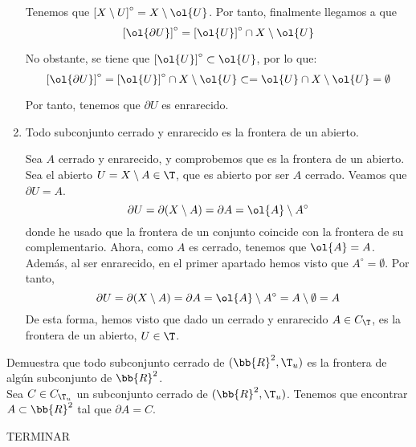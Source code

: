 \begin{ejercicio}
\begin{enumerate}
        Tenemos que $\left[X\setminus U\right]^\circ=X\setminus \ol{U}$. Por tanto, finalmente llegamos a que 
        $$\left[\ol{\partial U}\right]^\circ
            = \left[\ol{U}\right]^\circ\cap X\setminus\ol{U}
        $$

        No obstante, se tiene que $\left[\ol{U}\right]^\circ\subset \ol{U}$, por lo que:
        $$\left[\ol{\partial U}\right]^\circ
            = \left[\ol{U}\right]^\circ\cap X\setminus\ol{U}
            \subset 
            = \ol{U} \cap X\setminus\ol{U} = \emptyset
        $$

        Por tanto, tenemos que $\partial U$ es enrarecido.
        
        \item Todo subconjunto cerrado y enrarecido es la frontera de un abierto.

        Sea $A$ cerrado y enrarecido, y comprobemos que es la frontera de un abierto. Sea el abierto $U=X\setminus A\in \T$, que es abierto por ser $A$ cerrado. Veamos que $\partial U=A$.
        \begin{equation*}
            \partial U = \partial (X\setminus A) = \partial A = \ol{A}\setminus A^\circ
        \end{equation*}
        donde he usado que la frontera de un conjunto coincide con la frontera de su complementario. Ahora, como $A$ es cerrado, tenemos que $\ol{A}=A$. Además, al ser enrarecido, en el primer apartado hemos visto que $A^\circ = \emptyset$. Por tanto, 
        \begin{equation*}
            \partial U = \partial (X\setminus A) = \partial A = \ol{A}\setminus A^\circ = A\setminus \emptyset = A
        \end{equation*}
        De esta forma, hemos visto que dado un cerrado y enrarecido $A\in C_\T$, es la frontera de un abierto, $U\in \T$.
    \end{enumerate}
\end{ejercicio}

\begin{ejercicio}
    Demuestra que todo subconjunto cerrado de $(\bb{R}^2, \T_u)$ es la frontera de algún subconjunto de $\bb{R}^2$.\\

    Sea $C\in C_{\T_u}$ un subconjunto cerrado de $(\bb{R}^2, \T_u)$. Tenemos que encontrar $A\subset  \bb{R}^2$ tal que $\partial A=C$.

    TERMINAR
\end{ejercicio}

